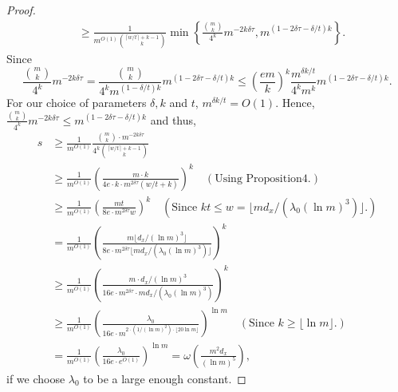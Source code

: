 \begin{proof}
\begin{align*}
&\ge\frac1{m^{O(1)}\binom{\lceil w/t\rceil+k-1}k}
\min\left\{\frac{\binom mk}{4^k}m^{-2k\delta\tau},
m^{(1-2\delta\tau-\delta/t)k}\right\}.
\end{align*}
Since
\[
\frac{\binom mk}{4^k}m^{-2k\delta\tau}
=\frac{\binom mk}{4^km^{(1-\delta/t)k}}m^{(1-2\delta\tau-\delta/t)k}
\le\left(\frac{em}k\right)^k\frac{m^{\delta k/t}}{4^km^k}
m^{(1-2\delta\tau-\delta/t)k}.
\]
For our choice of parameters $\delta,k$ and $t$, $m^{\delta k/t}=O(1)$. Hence, $\frac{\binom mk}{4^k}m^{-2k\delta\tau}\le m^{(1-2\delta\tau-\delta/t)k}$ and thus,
\begin{align*}
s&\ge\frac1{m^{O(1)}}\frac{\binom mk\cdot m^{-2k\delta\tau}}{4^k\binom{\lceil w/t\rceil+k-1}k}\\
&\ge\frac1{m^{O(1)}}\left(\frac{m\cdot k}{4e\cdot k\cdot m^{2\delta\tau}(w/t+k)}\right)^k\quad(\text{Using Proposition4.})\\
&\ge\frac1{m^{O(1)}}\left(\frac{mt}{8e\cdot m^{2\delta\tau}w}\right)^k
\quad(\text{Since }kt\le w=\lfloor md_x/(\lambda_0(\ln m)^3)\rfloor.)\\
&=\frac1{m^{O(1)}}\left(\frac{m\lfloor d_x/(\ln m)^3\rfloor}
{8e\cdot m^{2\delta\tau}\lfloor md_x/(\lambda_0(\ln m)^3)\rfloor}\right)^k\\
&\ge\frac1{m^{O(1)}}\left(\frac{m\cdot d_x/(\ln m)^3}
{16e\cdot m^{2\delta\tau}\cdot md_x/(\lambda_0(\ln m)^3)}\right)^k\\
&\ge\frac1{m^{O(1)}}\left(\frac{\lambda_0}{16e\cdot m^{2\cdot(1/(\ln m)^2)\cdot\lfloor20\ln m\rfloor}}\right)^{\ln m}
\quad(\text{Since }k\ge\lfloor\ln m\rfloor.)\\
&=\frac1{m^{O(1)}}\left(\frac{\lambda_0}{16e\cdot e^{O(1)}}\right)^{\ln m}
=\omega\left(\frac{m^2d_x}{(\ln m)^5}\right),
\end{align*}
if we choose $\lambda_0$ to be a large enough constant.
\end{proof}
